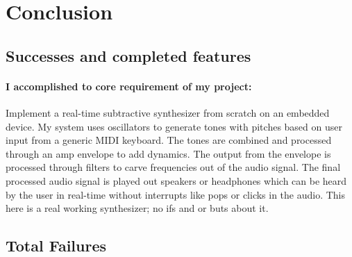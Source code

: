 \documentclass[acmlarge,screen]{acmart}
\begin{document}
\section{Conclusion}
	\subsection{Successes and completed features} 
	\paragraph{I accomplished to core requirement of my project:} Implement a real-time subtractive synthesizer from scratch on an embedded device. My system uses oscillators to generate tones with pitches based on user input from a generic MIDI keyboard. The tones are combined and processed through an amp envelope to add dynamics. The output from the envelope is processed through filters to carve frequencies out of the audio signal. The final processed audio signal is played out speakers or headphones which can be heard by the user in real-time without interrupts like pops or clicks in the audio. This here is a real working synthesizer; no ifs and or buts about it.
	
	\subsection{Total Failures}
\end{document}
